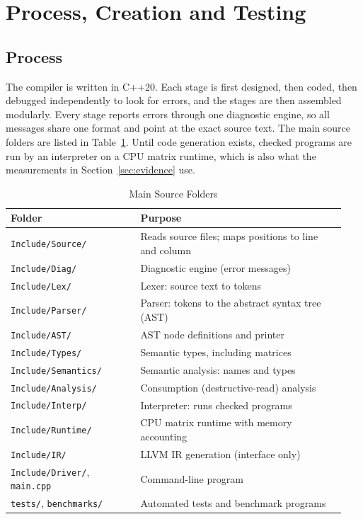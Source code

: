 \documentclass[a4paper]{article}
\begin{document}
	
	\section{Process, Creation and Testing}
	
	\subsection{Process}
	
	The compiler is written in C++20. Each stage is first designed, then coded, then debugged independently to look for errors, and the stages are then assembled modularly. Every stage reports errors through one diagnostic engine, so all messages share one format and point at the exact source text. The main source folders are listed in Table~\ref{tab:modules}. Until code generation exists, checked programs are run by an interpreter on a CPU matrix runtime, which is also what the measurements in Section~\ref{sec:evidence} use.

	\begin{table}[h]
		\centering
		\caption{Main Source Folders}
		\label{tab:modules}
		\begin{tabular}{@{}>{\RaggedRight}p{0.36\linewidth} >{\RaggedRight}p{0.58\linewidth}@{}}
			\toprule
			Folder & Purpose \\
			\midrule
			\texttt{Include/Source/} & Reads source files; maps positions to line and column \\
			\texttt{Include/Diag/} & Diagnostic engine (error messages) \\
			\texttt{Include/Lex/} & Lexer: source text to tokens \\
			\texttt{Include/Parser/} & Parser: tokens to the abstract syntax tree (AST) \\
			\texttt{Include/AST/} & AST node definitions and printer \\
			\texttt{Include/Types/} & Semantic types, including matrices \\
			\texttt{Include/Semantics/} & Semantic analysis: names and types \\
			\texttt{Include/Analysis/} & Consumption (destructive-read) analysis \\
			\texttt{Include/Interp/} & Interpreter: runs checked programs \\
			\texttt{Include/Runtime/} & CPU matrix runtime with memory accounting \\
			\texttt{Include/IR/} & LLVM IR generation (interface only) \\
			\texttt{Include/Driver/}, \texttt{main.cpp} & Command-line program \\
			\texttt{tests/}, \texttt{benchmarks/} & Automated tests and benchmark programs \\
			\bottomrule
		\end{tabular}
	\end{table}
	
\end{document}
